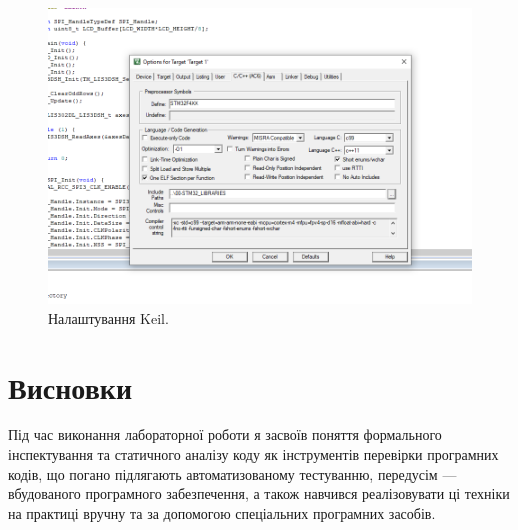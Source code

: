 \documentclass[oneside,14pt]{extarticle}
\begin{document}
\begin{normalsize}
\begin{figure}[H]
	    \centering
	    \includegraphics[scale=0.45]{2}
	    \caption{Налаштування Keil.}
	\end{figure}
	
	\section*{Висновки}
	Під час виконання лабораторної роботи я засвоїв поняття формального інспектування та статичного аналізу коду як інструментів перевірки програмних кодів, що погано підлягають автоматизованому тестуванню, передусім — вбудованого програмного забезпечення, а також навчився реалізовувати ці техніки на практиці вручну та за допомогою спеціальних програмних засобів.
	    
\end{normalsize}
\end{document}

